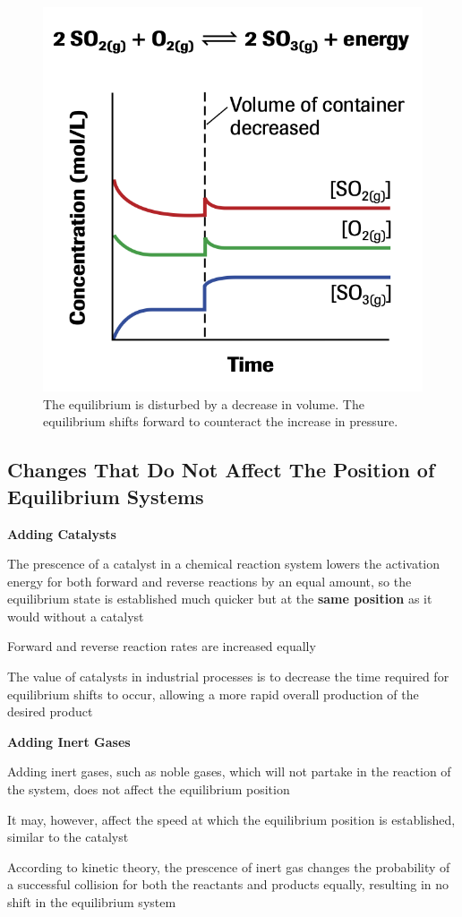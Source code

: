 \begin{figure}[ht!]
    \centering
    \includegraphics[width=0.4 \textwidth]{../figures/sulfur-trioxide-synthesis-equilibrium-change-gas.png}
    \caption{The equilibrium is disturbed by a decrease in volume. The equilibrium shifts forward
    to counteract the increase in pressure.}
\end{figure}

\subsection{Changes That Do Not Affect The Position of Equilibrium Systems}
\begin{bulleted-list}
    \item \textbf{Adding Catalysts}
        \begin{bulleted-list}
            \item The prescence of a catalyst in a chemical reaction system lowers the activation
                energy for both forward and reverse reactions by an equal amount, so the equilibrium
                state is established much quicker but at the \textbf{same position} as it would without
                a catalyst
            \item Forward and reverse reaction rates are increased equally
            \item The value of catalysts in industrial processes is to decrease the time required
                for equilibrium shifts to occur, allowing a more rapid overall production of the
                desired product
        \end{bulleted-list}
    \item \textbf{Adding Inert Gases}
        \begin{bulleted-list}
            \item Adding inert gases, such as noble gases, which will not partake in the reaction
                of the system, does not affect the equilibrium position
            \item It may, however, affect the speed at which the equilibrium position is established,
                similar to the catalyst
            \item According to kinetic theory, the prescence of inert gas changes the probability
                of a successful collision for both the reactants and products equally,
                resulting in no shift in the equilibrium system
        \end{bulleted-list}
\end{bulleted-list}

